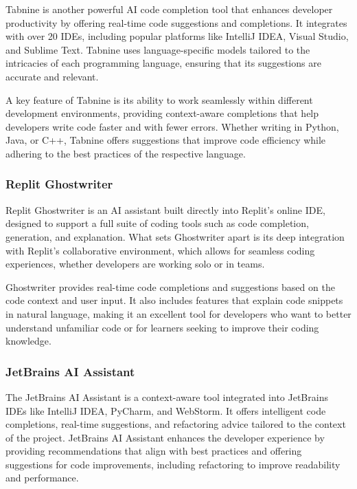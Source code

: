 Tabnine \cite{Tabnine} is another powerful AI code completion tool that enhances developer productivity by offering real-time code suggestions and completions. It integrates with over 20 IDEs, including popular platforms like IntelliJ IDEA, Visual Studio, and Sublime Text. Tabnine uses language-specific models tailored to the intricacies of each programming language, ensuring that its suggestions are accurate and relevant.

A key feature of Tabnine is its ability to work seamlessly within different development environments, providing context-aware completions that help developers write code faster and with fewer errors. Whether writing in Python, Java, or C++, Tabnine offers suggestions that improve code efficiency while adhering to the best practices of the respective language.

\subsubsection{Replit Ghostwriter}

Replit Ghostwriter \cite{ReplitGhostwriter} is an AI assistant built directly into Replit's online IDE, designed to support a full suite of coding tools such as code completion, generation, and explanation. What sets Ghostwriter apart is its deep integration with Replit's collaborative environment, which allows for seamless coding experiences, whether developers are working solo or in teams.

Ghostwriter provides real-time code completions and suggestions based on the code context and user input. It also includes features that explain code snippets in natural language, making it an excellent tool for developers who want to better understand unfamiliar code or for learners seeking to improve their coding knowledge.

\subsubsection{JetBrains AI Assistant}

The JetBrains AI Assistant \cite{JetBrainsAIAssistant} is a context-aware tool integrated into JetBrains IDEs like IntelliJ IDEA, PyCharm, and WebStorm. It offers intelligent code completions, real-time suggestions, and refactoring advice tailored to the context of the project. JetBrains AI Assistant enhances the developer experience by providing recommendations that align with best practices and offering suggestions for code improvements, including refactoring to improve readability and performance.

